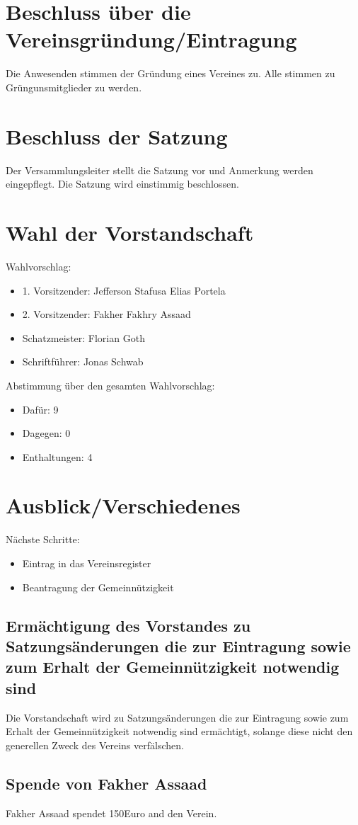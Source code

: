 \documentclass[a4paper,german,12pt]{scrartcl}
\begin{document}
\section{Beschluss über die Vereinsgründung/Eintragung}
Die Anwesenden stimmen der Gründung eines Vereines zu. Alle stimmen zu Grüngunsmitglieder zu werden.

\section{Beschluss der Satzung}
Der Versammlungsleiter stellt die Satzung vor und Anmerkung werden eingepflegt. Die Satzung wird einstimmig beschlossen.


\section{Wahl der Vorstandschaft}
Wahlvorschlag:
\begin{itemize}
\item 1. Vorsitzender: Jefferson Stafusa Elias Portela
\item 2. Vorsitzender: Fakher Fakhry Assaad
\item Schatzmeister: Florian Goth
\item Schriftführer: Jonas Schwab
\end{itemize}
Abstimmung über den gesamten Wahlvorschlag:
\begin{itemize}
\item Dafür: 9
\item Dagegen: 0
\item Enthaltungen: 4
\end{itemize}

\section{Ausblick/Verschiedenes}

Nächste Schritte:
\begin{itemize}
\item Eintrag in das Vereinsregister
\item Beantragung der Gemeinnützigkeit
\end{itemize}

\subsection{Ermächtigung des Vorstandes zu Satzungsänderungen die zur Eintragung sowie zum Erhalt der Gemeinnützigkeit notwendig sind}

Die Vorstandschaft wird zu Satzungsänderungen die zur Eintragung sowie zum Erhalt der Gemeinnützigkeit notwendig sind ermächtigt, solange diese nicht den generellen Zweck des Vereins verfälschen.

\subsection{Spende von Fakher Assaad}
Fakher Assaad spendet 150\;Euro and den Verein.


\end{document}
